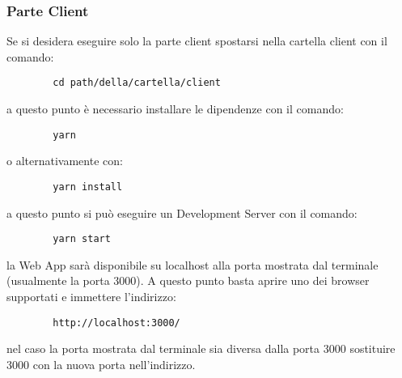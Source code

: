         \subsubsection{Parte Client}
        Se si desidera eseguire solo la parte client spostarsi nella cartella client con il comando:
        \begin{verbatim}
        cd path/della/cartella/client
        \end{verbatim}
        a questo punto è necessario installare le dipendenze con il comando: 
        \begin{verbatim}
        yarn
        \end{verbatim}
        o alternativamente con:
        \begin{verbatim}
        yarn install
        \end{verbatim}
        a questo punto si può eseguire un Development Server con il comando:
        \begin{verbatim}
        yarn start
        \end{verbatim}
        la Web App sarà disponibile su localhost alla porta mostrata dal terminale (usualmente la porta 3000). A questo punto basta aprire uno dei browser supportati e immettere l'indirizzo:
        \begin{verbatim}
        http://localhost:3000/
        \end{verbatim}
        nel caso la porta mostrata dal terminale sia diversa dalla porta 3000 sostituire 3000 con la nuova porta nell'indirizzo.